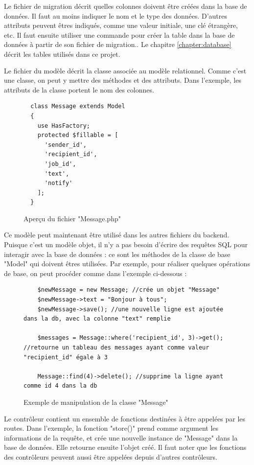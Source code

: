 \documentclass[
    iai, %
    eai, %
]{heig-tb}
\begin{document}
Le fichier de migration décrit quelles colonnes doivent être créées dans la base de données. Il faut au moins indiquer le nom et le type des données. D'autres attributs peuvent êtres indiqués, comme une valeur initiale, une clé étrangère, etc. Il faut ensuite utiliser une commande pour créer la table dans la base de données à partir de son fichier de migration..
Le chapitre \ref{chapter:database} décrit les tables utilisés dans ce projet.

\newpage
Le fichier du modèle décrit la classe associée au modèle relationnel. Comme c'est une classe, on peut y mettre des méthodes et des attributs. Dans l'exemple, les attributs de la classe portent le nom des colonnes.

\begin{figure}[h]
  \begin{verbatim}
  class Message extends Model
  {
    use HasFactory;
    protected $fillable = [
      'sender_id',
      'recipient_id',
      'job_id',
      'text',
      'notify'
    ];
  }
  \end{verbatim}
  \caption{Aperçu du fichier "Message.php"}
\end{figure}

Ce modèle peut maintenant être utilisé dans les autres fichiers du backend. Puisque c'est un modèle objet, il n'y a pas besoin d'écrire des requêtes SQL pour interagir avec la base de données : ce sont les méthodes de la classe de base "Model" qui doivent êtres utilisées. Par exemple, pour réaliser quelques opérations de base, on peut procéder comme dans l'exemple ci-dessous :

\begin{figure}[h]
  \begin{verbatim}
    $newMessage = new Message; //crée un objet "Message"
    $newMessage->text = "Bonjour à tous";
    $newMessage->save(); //une nouvelle ligne est ajoutée dans la db, avec la colonne "text" remplie

    $messages = Message::where('recipient_id', 3)->get(); //retourne un tableau des messages ayant comme valeur "recipient_id" égale à 3

    Message::find(4)->delete(); //supprime la ligne ayant comme id 4 dans la db
  \end{verbatim}
  \caption{Exemple de manipulation de la classe "Message"}
\end{figure}

Le contrôleur contient un ensemble de fonctions destinées à être appelées par les routes. Dans l'exemple, la fonction "store()" prend comme argument les informations de la requête, et crée une nouvelle instance de "Message" dans la base de données. Elle retourne ensuite l'objet créé. Il faut noter que les fonctions des contrôleurs peuvent aussi être appelées depuis d'autres contrôleurs.
\end{document}
